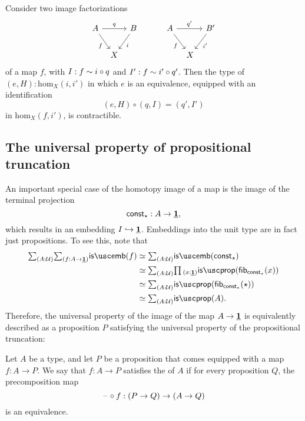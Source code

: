 \begin{cor}\label{cor:uniqueness-image}
  Consider two image factorizations
  \begin{equation*}
    \begin{tikzcd}[column sep=tiny]
      A \arrow[dr,swap,"f"] \arrow[rr,"q"] & & B \arrow[dl,"i"] &[2em] A \arrow[dr,swap,"f"] \arrow[rr,"{q'}"] & & B' \arrow[dl,"{i'}"] \\
      & X & & \phantom{B'} & X
    \end{tikzcd}
  \end{equation*}
  of a map $f$, with $I:f\sim i\circ q$ and $I':f\sim i'\circ q'$. Then the type of $(e,H):\mathrm{hom}_X(i,i')$ in which $e$ is an equivalence, equipped with an identification
  \begin{equation*}
    (e,H)\circ(q,I)=(q',I')
  \end{equation*}
  in $\mathrm{hom}_X(f,i')$, is contractible.
\end{cor}

\subsection{The universal property of propositional truncation}\label{sec:propositional-truncation-up}

An important special case of the homotopy image of a map is the image of the terminal projection
\begin{equation*}
  \mathsf{const}_\star : A \to \underline{\mathbf{1}},
\end{equation*}
which results in an embedding $I\hookrightarrow \underline{\mathbf{1}}$. Embeddings into the unit type are in fact just propositions. To see this, note that
\begin{align*}
\sm{A:\UU}{f:A\to\unit}\isemb(f)
& \eqvsym \sm{A:\UU}\isemb(\const_\ttt) \\
& \eqvsym \sm{A:\UU}\prd{x:\unit}\isprop(\fib{\const_\ttt}{x}) \\
& \eqvsym \sm{A:\UU}\isprop(\fib{\const_\ttt}{\ttt}) \\
& \eqvsym \sm{A:\UU}\isprop(A).
\end{align*}
Therefore, the universal property of the image of the map $A\to\underline{\mathbf{1}}$ is equivalently described as a proposition $P$ satisfying the universal property of the propositional truncation:

\begin{defn}
Let $A$ be a type, and let $P$ be a proposition that comes equipped with a map $f:A\to P$. We say that $f:A\to P$ satisfies the  of $A$ if for every proposition $Q$, the precomposition map
\begin{equation*}
\mathord{\hspace{1pt}\text{--}\hspace{1pt}}\circ f:(P\to Q)\to (A\to Q)
\end{equation*}
is an equivalence.
\end{defn}

